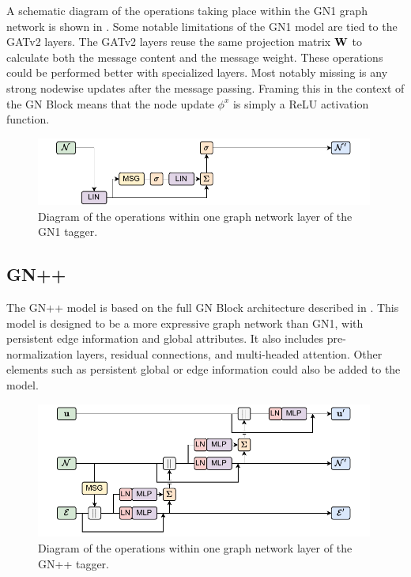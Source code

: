 A schematic diagram of the operations taking place within the GN1 graph network is shown in .
Some notable limitations of the GN1 model are tied to the GATv2 layers.
The GATv2 layers reuse the same projection matrix $\mathbf{W}$ to calculate both the message content and the message weight.
These operations could be performed better with specialized layers.
Most notably missing is any strong nodewise updates after the message passing.
Framing this in the context of the GN Block means that the node update $\phi^x$ is simply a ReLU activation function.

\begin{figure}
    \centering
    \includegraphics[width=0.99\textwidth]{figures/flavour_tagging/gn1.pdf}
    \caption{Diagram of the operations within one graph network layer of the GN1 tagger.}
    \label{fig:gn1_graph}
\end{figure}

\subsection{GN++}

The GN++ model is based on the full GN Block architecture described in .
This model is designed to be a more expressive graph network than GN1, with persistent edge information and global attributes.
It also includes pre-normalization layers, residual connections, and multi-headed attention.
Other elements such as persistent global or edge information could also be added to the model.

\begin{figure}[h!]
    \centering
    \includegraphics[width=0.99\textwidth]{figures/flavour_tagging/gnpp.pdf}
    \caption{Diagram of the operations within one graph network layer of the GN++ tagger.}
    \label{fig:gnpp_graph}
\end{figure}

